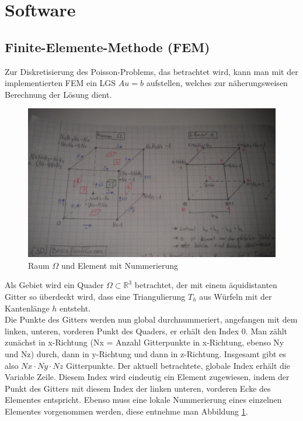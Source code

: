 \section{Software}

\subsection{Finite-Elemente-Methode (FEM)}
Zur Diskretisierung des Poisson-Problems, das betrachtet wird, kann man mit der implementierten FEM ein LGS $A u = b$ aufstellen, welches zur näherungsweisen Berechnung der Lösung dient. \\

\begin{figure}[h]
	\begin{center}
		\includegraphics[scale=0.15]{./Bilder/draft}
		
		\caption{Raum $\Omega$ und Element mit Nummerierung}\label{draft}
	\end{center}
\end{figure}

Als Gebiet wird ein Quader $\Omega \subset \mathbb{R}^{3}$ betrachtet, der mit einem äquidistanten Gitter so überdeckt wird, dass eine Triangulierung $T_h$ aus Würfeln mit der Kantenlänge $h$ entsteht. \\
Die Punkte des Gitters werden nun global durchnummeriert, angefangen mit dem linken, unteren, vorderen Punkt des Quaders, er erhält den Index 0. Man zählt zunächst in x-Richtung (Nx = Anzahl Gitterpunkte in x-Richtung, ebenso Ny und Nz) durch, dann in y-Richtung und dann in z-Richtung. Insgesamt gibt es also $Nx \cdot Ny \cdot Nz$ Gitterpunkte. Der aktuell betrachtete, globale Index erhält die Variable \glqq Zeile\grqq. Diesem Index wird eindeutig ein Element zugewiesen, indem der Punkt des Gitters mit diesem Index der linken unteren, vorderen Ecke des Elementes entspricht. Ebenso muss eine lokale Nummerierung eines einzelnen Elementes vorgenommen werden, diese entnehme man Abbildung \ref{draft}.\\

